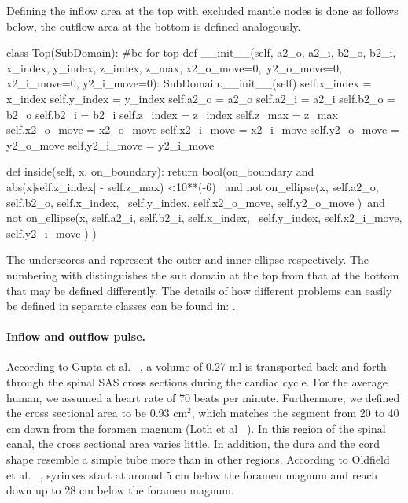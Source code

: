 Defining the inflow area at the top with excluded mantle nodes is done as follows below, the outflow area at the bottom is defined analogously.

\begin{code}
class Top(SubDomain):	#bc for top
	def __init__(self, a2_o, a2_i, b2_o, b2_i,  x_index, y_index, z_index, z_max, x2_o_move=0,\
				 y2_o_move=0, x2_i_move=0, y2_i_move=0):
		SubDomain.__init__(self)
		self.x_index = x_index
		self.y_index = y_index
		self.a2_o = a2_o
		self.a2_i = a2_i
		self.b2_o = b2_o
		self.b2_i = b2_i
		self.z_index = z_index
		self.z_max = z_max
		self.x2_o_move = x2_o_move
		self.x2_i_move = x2_i_move
		self.y2_o_move = y2_o_move
		self.y2_i_move = y2_i_move

	def inside(self, x, on_boundary):
		return bool(on_boundary and abs(x[self.z_index] - self.z_max) <10**(-6) \
                       and not on_ellipse(x, self.a2_o, self.b2_o, self.x_index,  \
                           self.y_index, self.x2_o_move, self.y2_o_move )\
                       and not on_ellipse(x, self.a2_i, self.b2_i, self.x_index, \ 
                           self.y_index, self.x2_i_move, self.y2_i_move ) ) 
\end{code}

The underscores \emp{o} and \emp{i} represent the outer and inner ellipse respectively. The numbering with  distinguishes the sub domain at the top from that at the bottom that may be defined differently. The details of how different problems can easily be defined in separate classes can be found in:
\emp{src/mesh\_definitions/}. %

\paragraph{Inflow and outflow pulse.} According to Gupta et al. ~\cite{Gupta2009}, a volume of 0.27 ml is transported back and forth through the spinal SAS cross sections during the cardiac cycle. For the average human, we assumed a heart rate of 70 beats per minute. Furthermore, we defined the cross sectional area to be 0.93 $\mathrm{cm^2}$, which matches the segment from 20 to 40 cm down from the foramen magnum (Loth et al ~\cite{Loth2001}). In this region of the spinal canal, the cross sectional area varies little. In addition, the dura and the cord shape resemble a simple tube more than in other regions. According to Oldfield et al. ~\cite{Oldfield1994}, syrinxes start at around 5 cm below the foramen magnum and reach down up to 28 cm below the foramen magnum. 

